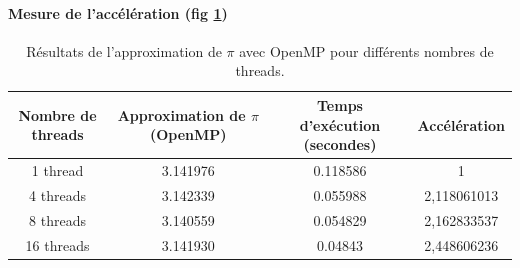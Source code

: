 \documentclass[a4paper,13pt]{book}
\begin{document}
\paragraph{Mesure de l'accélération (fig \ref{tab:pi_approximation})}
\begin{table}[h!]
    \centering
    \begin{tabular}{|c|c|c|c|}
        \hline
    \toprule
    \textbf{Nombre de threads} & \textbf{Approximation de $\pi$ (OpenMP)} & \textbf{Temps d'exécution (secondes)} & \textbf{Accélération}\\
    \midrule
    1 thread                  & 3.141976                                  & 0.118586        & 1                       \\\hline
    4 threads                 & 3.142339                                  & 0.055988         &    2,118061013                  \\\hline
    8 threads                 & 3.140559                                  & 0.054829           & 2,162833537                   \\\hline
    16 threads                 & 3.141930                                  &  0.04843           & 2,448606236                   \\\hline
    \bottomrule
    \end{tabular}
    \caption{Résultats de l'approximation de $\pi$ avec OpenMP pour différents nombres de threads.}
    \label{tab:pi_approximation}
    \end{table}
\end{document}
